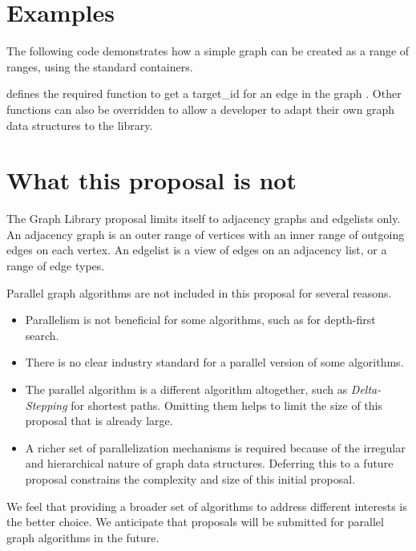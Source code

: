 \section{Examples}


The following code demonstrates how a simple graph can be created as a range of ranges, using the standard containers. 


{\small
  
}

 defines the required function to get a target\_id for an edge in the graph . Other functions can also
be overridden to allow a developer to adapt their own graph data structures to the library.

\section{What this proposal is  \textbf{not}}

The Graph Library proposal limits itself to adjacency graphs and edgelists only. An adjacency graph is an outer range of vertices with an inner range of outgoing
edges on each vertex. An edgelist is a view of edges on an adjacency list, or a range of edge types.

Parallel graph algorithms are not included in this proposal for several reasons.
\begin{itemize}
      \item Parallelism is not beneficial for some algorithms, such as for depth-first search.
      \item There is no clear industry standard for a parallel version of some algorithms.
      \item The parallel algorithm is a different algorithm altogether, such as \textit{Delta-Stepping} for shortest paths. 
            Omitting them helps to limit the size of this proposal that is already large.
      \item A richer set of parallelization mechanisms is required because of the irregular and hierarchical nature of graph 
            data structures. Deferring this to a future proposal constrains the complexity and size of this initial proposal.
\end{itemize}
We feel that providing a broader set of algorithms to address different interests is the better choice. 
We anticipate that proposals will be submitted for parallel graph algorithms in the future. 

